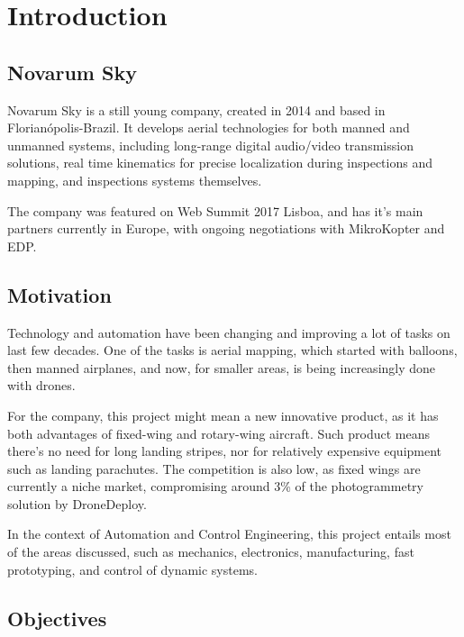 

\chapter{Introduction} \label{chap:Introduction}


\section{Novarum Sky}
	Novarum Sky is a still young company, created in 2014 and based in Florianópolis-Brazil. It develops aerial technologies for both manned and unmanned systems, including long-range digital audio/video transmission solutions, real time kinematics for precise localization during inspections and mapping, and inspections systems themselves.

The company was featured on Web Summit 2017 Lisboa, and has it's main partners currently in Europe, with ongoing negotiations with MikroKopter and EDP.

\section{Motivation}
Technology and automation have been changing and improving a lot of tasks on last few decades.
%
One of the tasks is aerial mapping, which started with balloons, then manned airplanes, and now, for smaller areas, is being increasingly done with drones\cite{dronesontherise}.
%

For the company, this project might mean a new innovative product, as it has both advantages of fixed-wing and rotary-wing aircraft.
Such product means there's no need for long landing stripes, nor for relatively expensive equipment such as landing parachutes. The competition is also low, as fixed wings are currently a niche market, compromising around 3\% of the photogrammetry solution by DroneDeploy\cite{dronedeployreport}.
%

In the context of Automation and Control Engineering, this project entails most of the areas discussed, such as mechanics, electronics, manufacturing, fast prototyping, and control of dynamic systems.
%	


\section{Objectives}

